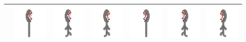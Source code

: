 \documentclass[../Main.tex]{subfiles}
\begin{document}
\begin{center}
\begin{tabular}{ | m{} | m{} m{} m{} m{} m{} m{} | }
                    & \centerline{\includegraphics[scale=3]{../res/textures/entities/enemies/dark/East.png}} & \centerline{\includegraphics[scale=3]{../res/textures/entities/enemies/dark/East-Walk-1.png}} & \centerline{\includegraphics[scale=3]{../res/textures/entities/enemies/dark/East-Walk-2.png}} & \centerline{\includegraphics[scale=3]{../res/textures/entities/enemies/dark/West.png}} & \centerline{\includegraphics[scale=3]{../res/textures/entities/enemies/dark/West-Walk-1.png}} & \centerline{\includegraphics[scale=3]{../res/textures/entities/enemies/dark/West-Walk-2.png}} \\
                    \hline
                \end{tabular}
            \end{center}
        \clearpage
\end{document}
